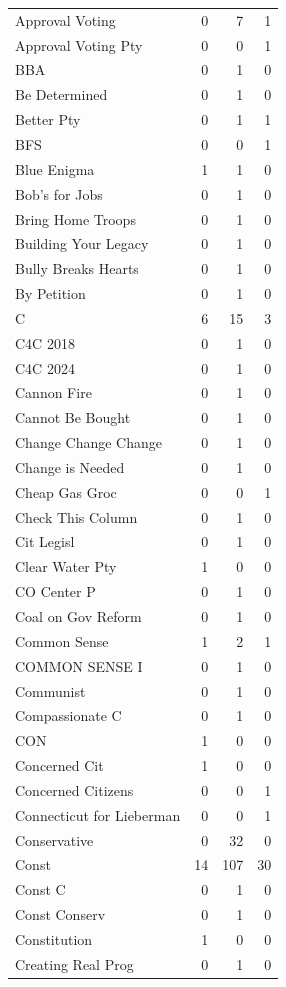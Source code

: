 \begin{supertabular}{lrrr}
Approval Voting & 0 & 7 & 1\\
Approval Voting Pty & 0 & 0 & 1\\
BBA & 0 & 1 & 0\\
Be Determined & 0 & 1 & 0\\
Better Pty & 0 & 1 & 1\\
BFS & 0 & 0 & 1\\
Blue Enigma & 1 & 1 & 0\\
Bob's for Jobs & 0 & 1 & 0\\
Bring Home Troops & 0 & 1 & 0\\
Building Your Legacy & 0 & 1 & 0\\
Bully Breaks Hearts & 0 & 1 & 0\\
By Petition & 0 & 1 & 0\\
C & 6 & 15 & 3\\
C4C 2018 & 0 & 1 & 0\\
C4C 2024 & 0 & 1 & 0\\
Cannon Fire & 0 & 1 & 0\\
Cannot Be Bought & 0 & 1 & 0\\
Change Change Change & 0 & 1 & 0\\
Change is Needed & 0 & 1 & 0\\
Cheap Gas Groc & 0 & 0 & 1\\
Check This Column & 0 & 1 & 0\\
Cit Legisl & 0 & 1 & 0\\
Clear Water Pty & 1 & 0 & 0\\
CO Center P & 0 & 1 & 0\\
Coal on Gov Reform & 0 & 1 & 0\\
Common Sense & 1 & 2 & 1\\
COMMON SENSE I & 0 & 1 & 0\\
Communist & 0 & 1 & 0\\
Compassionate C & 0 & 1 & 0\\
CON & 1 & 0 & 0\\
Concerned Cit & 1 & 0 & 0\\
Concerned Citizens & 0 & 0 & 1\\
Connecticut for Lieberman & 0 & 0 & 1\\
Conservative & 0 & 32 & 0\\
Const & 14 & 107 & 30\\
Const C & 0 & 1 & 0\\
Const Conserv & 0 & 1 & 0\\
Constitution & 1 & 0 & 0\\
Creating Real Prog & 0 & 1 & 0\\

\end{supertabular}
